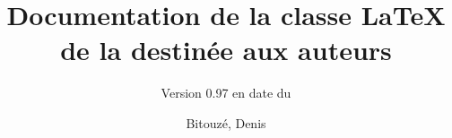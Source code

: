 \documentclass{gztarticle}
\newcommand{\releaseversion}{0.97}
\begin{document}
\title[short=Documentation de la classe de la \emph{Gazette} destinée aux
auteurs]{Documentation de la classe \LaTeX{} de la \gzt*{} destinée aux
  auteurs}
\subtitle[short=Version \releaseversion{}
(\displaydate{release-date})]{\bigskip\Large Version \releaseversion{} en date du
  }%
%
\author[%
affiliation={%
  Université du Littoral Côte d'Opale, Laboratoire de mathématiques pures et
  appliquées%
},%
photo=denis,%
email=denis.bitouze@lmpa.univ-littoral.fr,%
webpage=http://gte.univ-littoral.fr/members/dbitouze/pub/latex/,%
]{Bitouzé, Denis}
%
\maketitle*
%
\localtableofcontents
%




%
\printindex
%
\printbibliography
\end{document}
